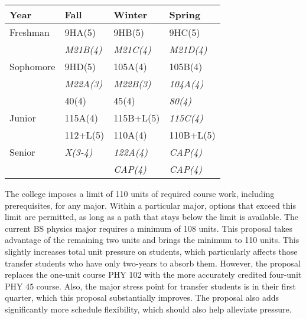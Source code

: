 \documentclass[12pt]{article}
\begin{document}
\vskip 2cm
\label{tbl:proposed-honors}
\begin{center}
\begin{tabular}{|l|l|l|l|}
\hline
Year      & Fall    & Winter & Spring \\
\hline
Freshman  & 9HA(5)       & 9HB(5)        & 9HC(5) \\
          & {\it M21B(4)} & {\it M21C(4)}  & {\it M21D(4)}\\
\hline
Sophomore & 9HD(5)       & 105A(4)      & 105B(4) \\
          & {\it M22A(3)} & {\it M22B(3)} & {\it 104A(4)} \\
          & 40(4)        & 45(4)       & {\it 80(4)}  \\
\hline
Junior    & 115A(4) & 115B+L(5)  & {\it 115C(4)}\\
          & 112+L(5)  & 110A(4)  & 110B+L(5)\\
\hline
Senior    & {\it X(3-4)} & {\it 122A(4)} & {\it CAP(4)} \\
          &              & {\it CAP(4)} & {\it CAP(4)} \\
\hline  
\end{tabular}
\end{center}

\newpage
The college imposes a limit of 110 units of required course work,
including prerequisites, for any major.  Within a particular major,
options that exceed this limit are permitted, as long as a path that
stays below the limit is available.  The current BS physics major
requires a minimum of 108 units.  This proposal takes advantage of the
remaining two units and brings the minimum to 110 units.  This
slightly increases total unit pressure on students, which particularly
affects those transfer students who have only two-years to absorb
them.  However, the proposal replaces the one-unit course PHY 102 with
the more accurately credited four-unit PHY 45 course.  Also, the major
stress point for transfer students is in their first quarter, which
this proposal substantially improves.  The proposal also adds
significantly more schedule flexibility, which should also help
alleviate pressure.
\end{document}
